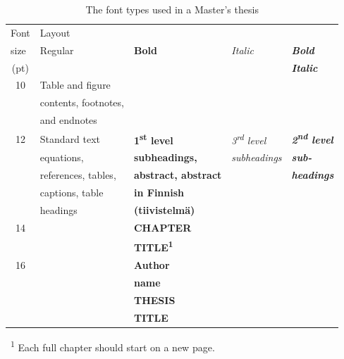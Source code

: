 \begin{table}[!ht]
  \def\arraystretch{1.1}%
  \begin{center}
    \caption{The font types used in a Master’s thesis}
    \label{tab:sample_table}
    \begin{tabular}{| c | l | l | l | l |}
      \hline
      \multicolumn{1}{|l|}{Font}  & \multicolumn{4}{l|}{Layout}
      \\\cline{2-5} \multicolumn{1}{|l|}{size} & Regular &
      \textbf{Bold} & \textit{Italic} & \textbf{\textit{Bold}} \\(pt)
      &  &  &  & \textbf{\textit{Italic}}\\
      \hline
      10 &  {\fontsize{10}{12pt}\selectfont Table and figure} &  &  &  \\
      &  {\fontsize{10}{12pt}\selectfont contents, footnotes,} &  &  &  \\
      &  {\fontsize{10}{12pt}\selectfont and endnotes} &  &  &  \\
      \hline
      12 & Standard text &  \textbf{1\textsuperscript{st} level} &
      \textit{3\textsuperscript{rd} level} &
      \textbf{\textit{2\textsuperscript{nd} level}}\\
      &  equations, &  \textbf{subheadings,} &  \textit{subheadings}
      &  \textbf{\textit{sub-}} \\
      & references, tables, & \textbf{abstract, abstract} &  &
      \textbf{\textit{headings}} \\
      & captions, table & \textbf{in Finnish} &  &  \\
      & headings & \textbf{(tiivistelmä)} &  &  \\
      \hline
      \rule{0pt}{0.8\normalbaselineskip}
      14 &  & {\fontsize{14}{17pt}\selectfont \textbf{CHAPTER}} &  &  \\
      &  & {\fontsize{14}{17pt}\selectfont
      \textbf{TITLE\textsuperscript{1}}} &  &  \\
      \hline
      \rule{0pt}{1.0\normalbaselineskip}
      16 &  & {\fontsize{16}{19pt}\selectfont \textbf{Author}} &  &  \\
      &  & {\fontsize{16}{19pt}\selectfont \textbf{name}} &  &  \\
      \hline
      \rule{0pt}{1.1\normalbaselineskip}
      {\fontsize{16}{19pt}\selectfont 18} &  &
      {\fontsize{18}{22pt}\selectfont \textbf{THESIS}} &  &  \\
      &  & {\fontsize{18}{22pt}\selectfont \textbf{TITLE}} &  &  \\
      \hline
    \end{tabular}
    \vspace{6pt}

  \raggedright \ \space \textsuperscript{1} Each full chapter should
  start on a new page.
\end{center}
\end{table}


